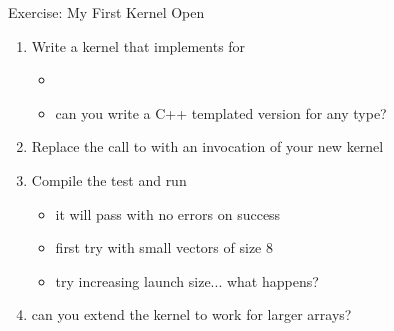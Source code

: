 \begin{frame}[fragile]{Exercise: My First Kernel}
    Open 

    \begin{enumerate}
        \item Write a kernel that implements \axpy for 
        \begin{itemize}
            \item {}
            \item \extra can you write a C++ templated version for any type?
        \end{itemize}

        \item Replace the call to  with an invocation of your new kernel
        \item Compile the test and run
        \begin{itemize}
            \item it will pass with no errors on success
            \item first try with small vectors of size 8
            \item try increasing launch size... what happens?
        \end{itemize}
        \item \extra can you extend the kernel to work for larger arrays?
    \end{enumerate}
\end{frame}


